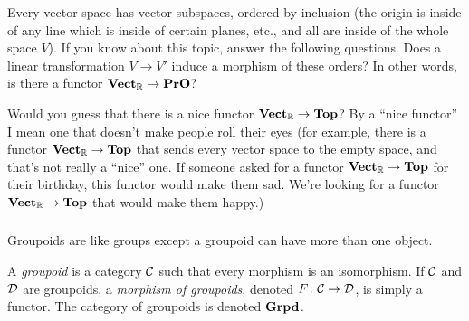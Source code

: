 \documentclass[CT4S-EN-RU]{subfiles}
\begin{document}
\begin{exampleRUS}
\end{exampleRUS}

\begin{exerciseENG}
Every vector space has vector subspaces, ordered by inclusion (the origin is inside of any line which is inside of certain planes, etc., and all are inside of the whole space $V$). If you know about this topic, answer the following questions.
\sexc Does a linear transformation $V\to V'$ induce a morphism of these orders? In other words, is there a functor ${\bf Vect}_{\mathbb R}\rightarrow{\bf PrO}$?
\item Would you guess that there is a nice functor ${\bf Vect}_{\mathbb R}\rightarrow{\bf Top}$? By a “nice functor” I mean one that doesn't make people roll their eyes (for example, there is a functor ${\bf Vect}_{\mathbb R}\rightarrow{\bf Top}$ that sends every vector space to the empty space, and that's not really a “nice” one. If someone asked for a functor ${\bf Vect}_{\mathbb R}\rightarrow{\bf Top}$ for their birthday, this functor would make them sad. We're looking for a functor ${\bf Vect}_{\mathbb R}\rightarrow{\bf Top}$ that would make them happy.)
\endsexc
\end{exerciseENG}

\begin{exerciseRUS}
\end{exerciseRUS}


\subsubsection{}\label{sec:groupoid}

\begin{blockENG}
Groupoids are like groups except a groupoid can have more than one object. 
\end{blockENG}

\begin{blockRUS}
\end{blockRUS}

\begin{definitionENG}
A {\em groupoid} is a category $\mathcal{C}$ such that every morphism is an isomorphism. If $\mathcal{C}$ and $\mathcal{D}$ are groupoids, a {\em morphism of groupoids}, denoted $F\colon\mathcal{C}\rightarrow\mathcal{D}$, is simply a functor. The category of groupoids is denoted ${\bf Grpd}$.
\end{definitionENG}
\end{document}
